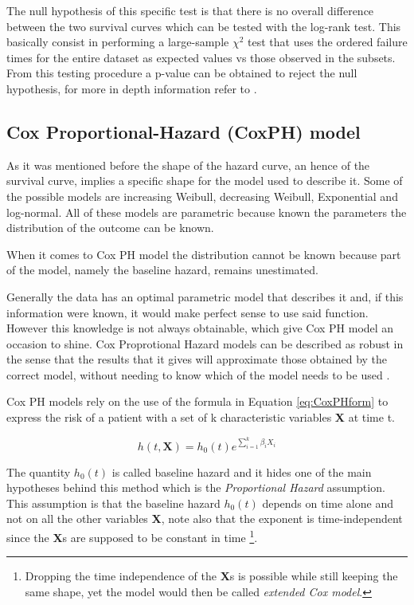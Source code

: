 The null hypothesis of this specific test is that there is no overall difference between the two survival curves \cite{SurvivalAnsalysis} which can be tested with the log-rank test.
This basically consist in performing a large-sample $\chi^2$ test that uses the ordered failure times for the entire dataset as expected values vs those observed in the subsets. 
From this testing procedure a p-value can be obtained to reject the null hypothesis, for more in depth information refer to \cite{SurvivalAnalysis}. 

\subsection{Cox Proportional-Hazard (CoxPH) model}
As it was mentioned before the shape of the hazard curve, an hence of the survival curve, implies a specific shape for the model used to describe it.
Some of the possible models are increasing Weibull, decreasing Weibull, Exponential and log-normal.
All of these models are parametric because known the parameters the distribution of the outcome can be known. 

When it comes to Cox PH model the distribution cannot be known because part of the model, namely the baseline hazard, remains unestimated.

Generally the data has an optimal parametric model that describes it and, if this information were known, it would make perfect sense to use said function.
However this knowledge is not always obtainable, which give Cox PH model an occasion to shine.
Cox Proprotional Hazard models can be described as robust in the sense that the results that it gives will approximate those obtained by the correct model, without needing to know which of the model needs to be used \cite{SurvivalAnalysis}.
 
Cox PH models rely on the use of the formula in Equation \ref{eq:CoxPHform} to express the risk of a patient with a set of k characteristic variables \textbf{X} at time t.

\begin{equation}\label{eq:CoxPHform}
h(t,\textbf{X}) = h_0(t)e^{\sum_{i=1}^k \beta_i X_i}
\end{equation}

The quantity $h_0(t)$ is called baseline hazard and it hides one of the main hypotheses behind this method which is the \textit{Proportional Hazard} assumption.
This assumption is that the baseline hazard $h_0(t)$ depends on time alone and not on all the other variables \textbf{X}, note also that the exponent is time-independent since the \textbf{X}s are supposed to be constant in time
\footnote{Dropping the time independence of the \textbf{X}s is possible while still keeping the same shape, yet the model would then be called \textit{extended Cox model}.}.

